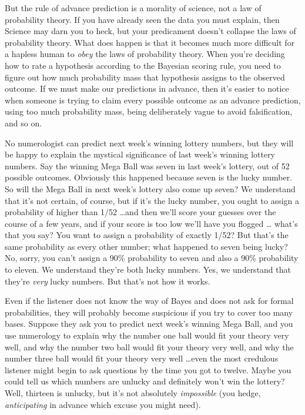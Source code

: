 {
 But the rule of advance prediction is a morality of science, not a
law of probability theory. If you have already seen the data you must
explain, then Science may darn you to heck, but your predicament
doesn't collapse the laws of probability theory. What
does happen is that it becomes much more difficult for a hapless human
to \textit{obey} the laws of probability theory. When
you're deciding how to rate a hypothesis according to
the Bayesian scoring rule, you need to figure out how much probability
mass that hypothesis assigns to the observed outcome. If we must make
our predictions in advance, then it's easier to notice
when someone is trying to claim every possible outcome as an advance
prediction, using too much probability mass, being deliberately vague
to avoid falsification, and so on.}

{
 No numerologist can predict next week's winning
lottery numbers, but they will be happy to explain the mystical
significance of last week's winning lottery numbers.
Say the winning Mega Ball was seven in last week's
lottery, out of 52 possible outcomes. Obviously this happened because
seven is the lucky number. So will the Mega Ball in next
week's lottery also come up seven? We understand that
it's not certain, of course, but if
it's the lucky number, you ought to assign a
probability of higher than 1/52 \ldots and then we'll
score your guesses over the course of a few years, and if your score is
too low we'll have you flogged \ldots
what's that you say? You want to assign a probability
of exactly 1/52? But that's the same probability as
every other number; what happened to seven being lucky? No, sorry, you
can't assign a 90\% probability to seven and also a
90\% probability to eleven. We understand they're both
lucky numbers. Yes, we understand that they're
\textit{very} lucky numbers. But that's not how it
works.}

{
 Even if the listener does not know the way of Bayes and does not
ask for formal probabilities, they will probably become suspicious if
you try to cover too many bases. Suppose they ask you to predict next
week's winning Mega Ball, and you use numerology to
explain why the number one ball would fit your theory very well, and
why the number two ball would fit your theory very well, and why the
number three ball would fit your theory very well \ldots even the most
credulous listener might begin to ask questions by the time you got to
twelve. Maybe you could tell us which numbers are unlucky and
definitely won't win the lottery? Well, thirteen is
unlucky, but it's not absolutely \textit{impossible}
(you hedge, \textit{anticipating} in advance which excuse you might
need).}

